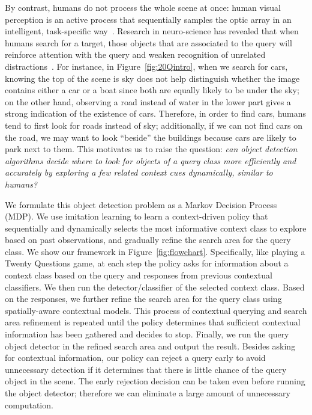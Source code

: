 By contrast, humans do not process the whole scene at once: human visual perception is an active process that sequentially samples the optic array in an intelligent, task-specific way~\cite{najemnik2005optimal}. Research in neuro-science has revealed that when humans search for a target, those objects that are associated to the query will reinforce attention with the query and weaken recognition of unrelated distractions~\cite{moores2003associative}. 
For instance, in Figure~\ref{fig:20Qintro}, when we search for cars, knowing the top of the scene is sky does not help distinguish whether the image contains either a car or a boat since both are equally likely to be under the sky; 
on the other hand, observing a road instead of water in the lower part gives a strong indication of the existence of cars. 
Therefore, in order to find cars, humans tend to first look for roads instead of sky; additionally, if we can not find cars on the road,  we may want to look ``beside'' the buildings because cars are likely to park next to them. %
This motivates us to raise the question: \textit{can object detection algorithms decide where to look for objects of a query class more efficiently and accurately by exploring a few related context cues dynamically, similar to humans?}

We formulate this object detection problem as a Markov Decision Process (MDP). 
We use imitation learning to learn a context-driven policy that sequentially and dynamically selects the most informative context class to explore based on past observations, and gradually refine the search area for the query class. 
We show our framework in Figure~\ref{fig:flowchart}.  Specifically, like playing a Twenty Questions game, at each step the policy asks for information about a context class based on the query and responses from previous contextual classifiers. 
We then run the detector/classifier of the selected context class. Based on the responses, we further refine the search area for the query class using spatially-aware contextual models. 
This process of contextual querying and search area refinement is repeated until the policy determines that sufficient contextual information has been gathered and decides to stop. 
Finally, we run the query object detector in the refined search area and output the result. 
Besides asking for contextual information, our policy can reject a query early to avoid unnecessary detection if it determines that there is little chance of the query object in the scene. 
The early rejection decision can be taken even before running the object detector; therefore we can eliminate a large amount of unnecessary computation. 

